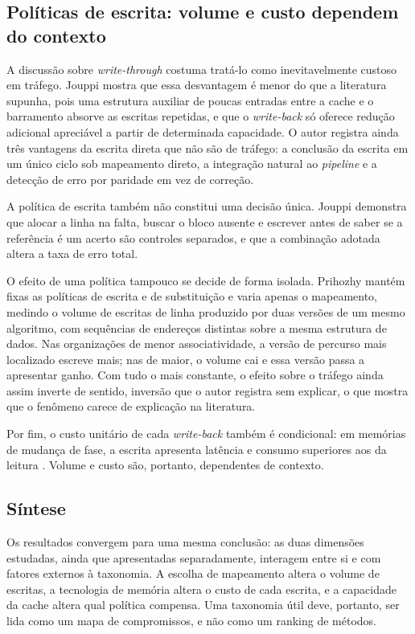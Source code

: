 \documentclass[12pt]{article}
\begin{document}
\subsection{Políticas de escrita: volume e custo dependem do contexto}

A discussão sobre \textit{write-through} costuma tratá-lo como
inevitavelmente custoso em tráfego. Jouppi \cite{jouppi1993} mostra que essa
desvantagem é menor do que a literatura supunha, pois uma estrutura
auxiliar de poucas entradas entre a cache e o barramento absorve as
escritas repetidas, e que o \textit{write-back} só oferece redução
adicional apreciável a partir de determinada capacidade. O autor registra
ainda três vantagens da escrita direta que não são de tráfego: a
conclusão da escrita em um único ciclo sob mapeamento direto, a
integração natural ao \textit{pipeline} e a detecção de erro por
paridade em vez de correção.

A política de escrita também não constitui uma decisão única. Jouppi
\cite{jouppi1993} demonstra que alocar a linha na falta, buscar o bloco ausente e
escrever antes de saber se a referência é um acerto são controles
separados, e que a combinação adotada altera a taxa de erro total.

O efeito de uma política tampouco se decide de forma isolada. Prihozhy
\cite{prihozhy2019} mantém fixas as políticas de escrita e de substituição e varia
apenas o mapeamento, medindo o volume de escritas de linha produzido por
duas versões de um mesmo algoritmo, com sequências de endereços distintas
sobre a mesma estrutura de dados. Nas organizações de menor
associatividade, a versão de percurso mais localizado escreve mais; nas
de maior, o volume cai e essa versão passa a apresentar ganho. Com tudo
o mais constante, o efeito sobre o tráfego ainda assim inverte de
sentido, inversão que o autor registra sem explicar, o que mostra que o
fenômeno carece de explicação na literatura.

Por fim, o custo unitário de cada \textit{write-back} também é
condicional: em memórias de mudança de fase, a escrita apresenta latência
e consumo superiores aos da leitura \cite{zhang2016}. Volume e custo
são, portanto, dependentes de contexto.

\subsection{Síntese}

Os resultados convergem para uma mesma conclusão: as duas dimensões
estudadas, ainda que apresentadas separadamente, interagem entre si e com
fatores externos à taxonomia. A escolha de mapeamento altera o volume de
escritas, a tecnologia de memória altera o custo de cada escrita, e a
capacidade da cache altera qual política compensa. Uma taxonomia útil
deve, portanto, ser lida como um mapa de compromissos, e não como um
ranking de métodos.
\end{document}
